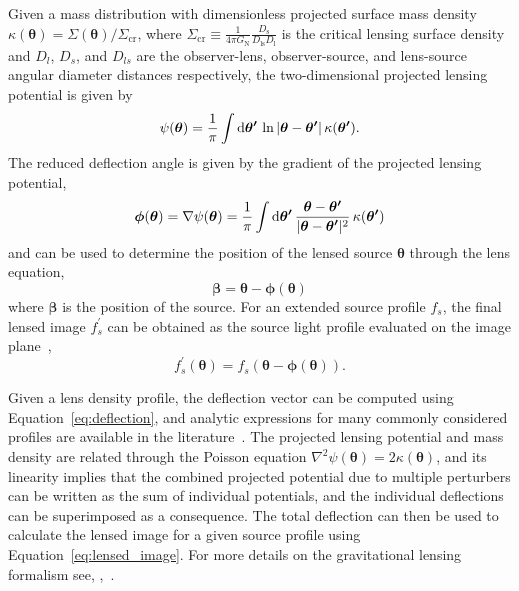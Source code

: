 \documentclass[twocolumn]{aastex63}
\begin{document}
Given a mass distribution with dimensionless projected surface mass density $\kappa(\boldsymbol{\theta})=\Sigma(\boldsymbol{\theta}) / \Sigma_{\mathrm{cr}}$, where $\Sigma_{\mathrm{cr}}\equiv \frac{1}{4 \pi G_\mathrm{N}} \frac{D_{\mathrm{s}}}{D_{\mathrm{ls}} D_{\mathrm{l}}}$ is the critical lensing surface density and $D_l$, $D_s$, and $D_{ls}$ are the observer-lens, observer-source, and lens-source angular diameter distances respectively, the two-dimensional projected lensing potential is given by~\citep[\eg,][]{1992grle.book.....S,astro-ph/9912508}
\begin{equation}
\psi(\boldsymbol{\theta})=\frac{1}{\pi} \int \diff \boldsymbol{\theta^\prime}\,\ln |\boldsymbol{\theta}-\boldsymbol{\theta^\prime}|\,\kappa(\boldsymbol{\theta^\prime}) .
\end{equation}
The reduced deflection angle is given by the gradient of the projected lensing potential,
\begin{equation}
\boldsymbol{\phi}(\boldsymbol{\theta}) = \nabla \psi(\boldsymbol{\theta}) = \frac{1}{\pi} \int \diff \boldsymbol{\theta^\prime}\,\frac{\boldsymbol{\theta}-\boldsymbol{\theta^\prime}}{|\boldsymbol{\theta}-\boldsymbol{\theta^\prime}|^2}\,\kappa(\boldsymbol{\theta^\prime})
\label{eq:deflection}
\end{equation}
and can be used to determine the position of the lensed source $\boldsymbol{\theta}$ through the lens equation,
\begin{equation}
\boldsymbol{\beta}=\boldsymbol{\theta}-\boldsymbol{\phi}(\boldsymbol{\theta})
\end{equation}
where $\boldsymbol{\beta}$ is the position of the source. For an extended source profile $f_s$, the final lensed image $f^\prime_s$ can be obtained as the source light profile evaluated on the image plane~\citep[\eg,][]{1706.06111},
\begin{equation}
f^\prime_s(\boldsymbol{\theta}) = f_s\left(\boldsymbol{\theta}-\boldsymbol{\phi}(\boldsymbol{\theta})\right).
\label{eq:lensed_image}
\end{equation}

Given a lens density profile, the deflection vector can be computed using Equation~\eqref{eq:deflection}, and analytic expressions for many commonly considered profiles are available in the literature~\citep[\eg,][]{2001astro.ph..2341K}. The projected lensing potential and mass density are related through the Poisson equation $\nabla^2 \psi(\boldsymbol{\theta}) = 2\kappa(\boldsymbol{\theta})$, and its linearity implies that the combined projected potential due to multiple perturbers can be written as the sum of individual potentials, and the individual deflections can be superimposed as a consequence. The total deflection can then be used to calculate the lensed image for a given source profile using Equation~\eqref{eq:lensed_image}. For more details on the gravitational lensing formalism see, \eg,~\citet{1992grle.book.....S,astro-ph/9912508,1003.5567}.
\end{document}

